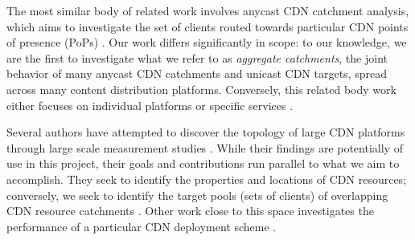 The most similar body of related work involves anycast CDN catchment analysis, which aims to
investigate the set of clients routed towards particular CDN points of presence (PoPs)
\cite{Calder2015, anycastvsddos, vdmscatchment}. Our work differs significantly in scope: to our 
knowledge, we are the first to investigate what we refer to as \emph{aggregate catchments}, the joint
behavior of many anycast CDN catchments and unicast CDN targets, spread across many content
distribution platforms. Conversely, this related body work either focuses on individual platforms or
specific services \cite{Calder2015, anycastvsddos, vdmscatchment}. 

Several authors have attempted to discover the topology of large CDN platforms through large scale
measurement studies \cite{webcart, Calder2013, benson11}. While their findings are potentially of
use in this project, their goals and contributions run parallel to what we aim to accomplish. They
seek to identify the properties and locations of CDN resources; conversely, we seek to identify the
target pools (sets of clients) of overlapping CDN resource catchments \cite{webcart, Calder2013,
benson11}. Other work close to this space investigates the performance of a particular CDN
deployment scheme \cite{ecs15sigcomm}.
